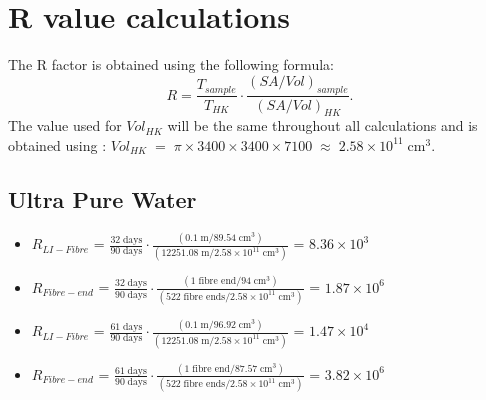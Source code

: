 \documentclass[a4paper,11pt]{article}
\begin{document}
\clearpage
\newpage

\section{R value calculations}
The R factor is obtained using the following formula:
\begin{equation*}
    R=\frac{T_{sample}}{T_{HK}}\cdot \frac{\left(SA/Vol\right)_{sample}}{\left(SA/Vol\right)_{HK}}.\label{eq:R}
\end{equation*}
The value used for $Vol_{HK}$ will be the same throughout all calculations and is obtained using : $Vol_{HK}\;=\; \pi\times3400\times3400\times7100\;\approx\; 2.58\times10^{11}\;\text{cm}^3$.


\subsection{Ultra Pure Water}\label{RCalcUPW}
\begin{itemize}
    \item $R_{LI-Fibre}$ = $\frac{32\;\text{days}}{90\;\text{days}}\cdot \frac{\left(0.1\;\text{m}/89.54\;\text{cm}^3\right)}{\left(12251.08\;\text{m}/2.58\times10^{11}\;\text{cm}^3\right)}$ = $8.36 \times 10^3$
    \item $R_{Fibre-end}$ = $\frac{32\;\text{days}}{90\;\text{days}}\cdot \frac{\left(1\;\text{fibre end}/94\;\text{cm}^3\right)}{\left(522\;\text{fibre ends}/2.58\times10^{11}\;\text{cm}^3\right)}$ = $1.87 \times 10^6$
    \item $R_{LI-Fibre}$ = $\frac{61\;\text{days}}{90\;\text{days}}\cdot \frac{\left(0.1\;\text{m}/96.92\;\text{cm}^3\right)}{\left(12251.08\;\text{m}/2.58\times10^{11}\;\text{cm}^3\right)}$ = $1.47 \times 10^4$
    \item $R_{Fibre-end}$ = $\frac{61\;\text{days}}{90\;\text{days}}\cdot \frac{\left(1\;\text{fibre end}/87.57\;\text{cm}^3\right)}{\left(522\;\text{fibre ends}/2.58\times10^{11}\;\text{cm}^3\right)}$ = $3.82 \times 10^6$
\end{itemize}
\end{document}
